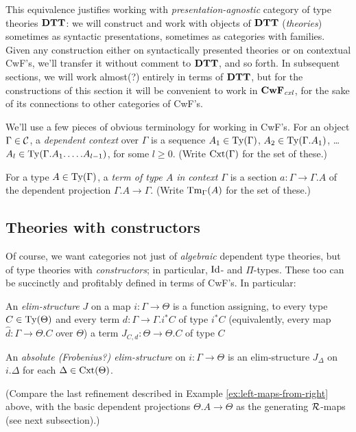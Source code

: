 \documentclass{amsart}
\begin{document}
This equivalence justifies working with \emph{presentation-agnostic} category of type theories $\mathbf{DTT}$: we will construct and work with objects of $\mathbf{DTT}$ (\emph{theories}) sometimes as syntactic presentations, sometimes as categories with families.  Given any construction either on syntactically presented theories or on contextual CwF's, we'll transfer it without comment to $\mathbf{DTT}$, and so forth.  In subsequent sections, we will work almost(?) entirely in terms of $\mathbf{DTT}$, but for the constructions of this section it will be convenient to work in $\mathbf{CwF}_{\mathit{cxl}}$, for the sake of its connections to other categories of CwF's.

\para We'll use a few pieces of obvious terminology for working in CwF's.  For an object $\Gamma \in \mathcal{C}$, a \emph{dependent context} over $\Gamma$ is a sequence $A_1 \in \mathrm{Ty}(\Gamma)$, $A_2 \in \mathrm{Ty}(\Gamma.A_1)$, \ldots $A_l \in \mathrm{Ty}(\Gamma.A_1.\ldots.A_{l-1})$, for some $l \geq 0$.  (Write $\mathrm{Cxt}(\Gamma)$ for the set of these.)

For a type $A \in \mathrm{Ty}(\Gamma)$, a \emph{term of type $A$ in context $\Gamma$} is a section $a : \Gamma \to \Gamma.A$ of the dependent projection $\Gamma.A \to \Gamma$.  (Write $\mathrm{Tm}_\Gamma(A)$ for the set of these.)


\subsection{Theories with constructors}

Of course, we want categories not just of \emph{algebraic} dependent type theories, but of type theories with \emph{constructors}; in particular, $\mathrm{Id}$- and $\Pi$-types.  These too can be succinctly and profitably defined in terms of CwF's.  In particular:

\begin{definition} An \emph{elim-structure} $J$ on a map $i : \Gamma \to \Theta$ is a function assigning, to every type $C \in \mathrm{Ty}(\Theta)$ and every term $d : \Gamma \to \Gamma.i^*C$ of type $i^*C$ (equivalently, every map $\hat{d} : \Gamma \to \Theta.C$ over $\Theta$) a term $J_{C,d} : \Theta \to \Theta.C$ of type $C$

An \emph{absolute (Frobenius?) elim-structure} on $i : \Gamma \to \Theta$ is an elim-structure $J_\Delta$ on $i.\Delta$ for each $\Delta \in \mathrm{Cxt}(\Theta)$.
\end{definition}

(Compare the last refinement described in Example \ref{ex:left-maps-from-right} above, with the basic dependent projections $\Theta.A \to \Theta$ as the generating $\mathcal{R}$-maps (see next subsection).)
\end{document}
